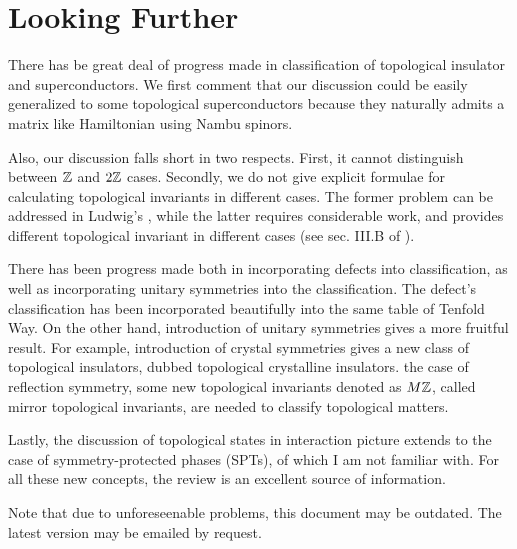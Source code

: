 \section{Looking Further}
\label{sec:Looking Further}
There has be great deal of progress made in classification of topological
insulator and superconductors. We first comment that our discussion could be
easily generalized to some topological superconductors because they naturally
admits a matrix like Hamiltonian using Nambu spinors.

Also, our discussion falls short in two respects. First, it cannot distinguish
between $\mathbb{Z}$ and $2\mathbb{Z}$ cases. Secondly, we do not give explicit formulae for
calculating topological invariants in different cases. The former problem can be
addressed in Ludwig's \cite{Schnyder2008}, while the latter requires
considerable work, and provides different topological invariant in different
cases (see sec. III.B of \cite{Chiu2016}).

There has been progress made both in incorporating defects into classification,
as well as incorporating unitary symmetries into the classification. The
defect's classification has been incorporated beautifully into the same table of
Tenfold Way. On the other hand, introduction of unitary symmetries gives a more
fruitful result. For example, introduction of crystal symmetries gives a new
class of topological insulators, dubbed topological crystalline
insulators.\cite{Ando2015} the case of reflection symmetry, some new topological
invariants denoted as $M\mathbb{Z}$, called mirror topological invariants, are needed to
classify topological matters\cite{Chiu2013}.

Lastly, the discussion of topological states in interaction picture extends to
the case of symmetry-protected phases (SPTs), of which I am not familiar with.
For all these new concepts, the review \cite{Chiu2016} is an excellent source of
information.

Note that due to unforeseenable problems, this document may be outdated. The
latest version may be emailed by request.
